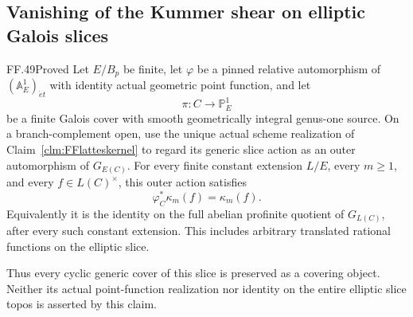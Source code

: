 \subsection{Vanishing of the Kummer shear on elliptic Galois slices}

\begin{claim}{FF.49}{Proved}\label{clm:FFellipticshear}
Let \(E/B_p\) be finite, let \(\varphi\) be a pinned
relative automorphism of \((\mathbb A^1_E)_{\acute et}\)
with identity actual geometric point function, and let
\[
                  \pi:C\longrightarrow\mathbb P^1_E
                                                        \tag{FF.49.1}
\]
be a finite Galois cover with smooth geometrically
integral genus-one source. On a branch-complement open,
use the unique actual scheme realization of
Claim~\ref{clm:FFlatteskernel} to regard its generic
slice action as an outer automorphism of \(G_{E(C)}\).
For every finite constant extension \(L/E\), every
\(m\ge1\), and every \(f\in L(C)^\times\), this
outer action satisfies
\[
                     \varphi_C^*\kappa_m(f)=\kappa_m(f).
                                                        \tag{FF.49.2}
\]
Equivalently it is the identity on the full abelian
profinite quotient of \(G_{L(C)}\), after every such
constant extension. This includes arbitrary translated
rational functions on the elliptic slice.

Thus every cyclic generic cover of this slice is
preserved as a covering object. Neither its actual
point-function realization nor identity on the entire
elliptic slice topos is asserted by this claim.
\end{claim}

